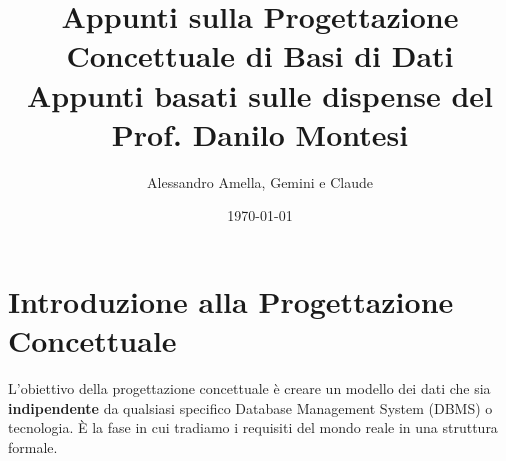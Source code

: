 

\usepackage{hyperref}


\title{Appunti sulla Progettazione Concettuale di Basi di Dati\\
  \large Appunti basati sulle dispense del Prof. Danilo Montesi}
\author{Alessandro Amella, Gemini e Claude}
\date{\today}


	
	\maketitle
	\tableofcontents
	\newpage
	
	\section{Introduzione alla Progettazione Concettuale}
	L'obiettivo della progettazione concettuale è creare un modello dei dati che sia \textbf{indipendente} da qualsiasi specifico Database Management System (DBMS) o tecnologia. È la fase in cui tradiamo i requisiti del mondo reale in una struttura formale.
	
